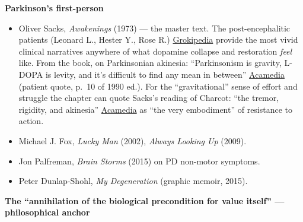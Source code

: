 \textbf{Parkinson's first-person}

\begin{itemize}
\tightlist
\item
  Oliver Sacks, \emph{Awakenings} (1973) --- the master text. The post-encephalitic patients (Leonard L., Hester Y., Rose R.) \href{https://grokipedia.com/page/Awakenings_(book)}{Grokipedia} provide the most vivid clinical narratives anywhere of what dopamine collapse and restoration \emph{feel} like. From the book, on Parkinsonian akinesia: ``Parkinsonism is gravity, L-DOPA is levity, and it's difficult to find any mean in between'' \href{http://www.acamedia.info/literature/alexanders_feast/awakenings/excerpts.htm}{Acamedia} (patient quote, p.~10 of 1990 ed.). For the ``gravitational'' sense of effort and struggle the chapter can quote Sacks's reading of Charcot: ``the tremor, rigidity, and akinesia'' \href{http://www.acamedia.info/literature/alexanders_feast/awakenings/excerpts.htm}{Acamedia} as ``the very embodiment'' of resistance to action.
\item
  Michael J. Fox, \emph{Lucky Man} (2002), \emph{Always Looking Up} (2009).
\item
  Jon Palfreman, \emph{Brain Storms} (2015) on PD non-motor symptoms.
\item
  Peter Dunlap-Shohl, \emph{My Degeneration} (graphic memoir, 2015).
\end{itemize}

\textbf{The ``annihilation of the biological precondition for value itself'' --- philosophical anchor}

